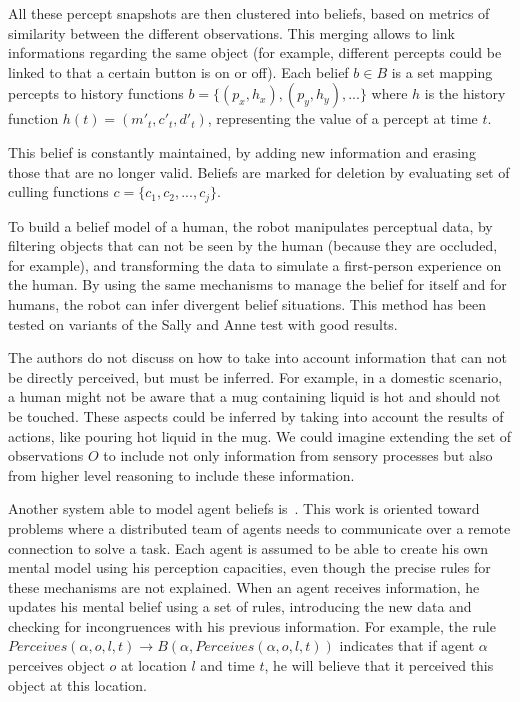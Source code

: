 All these percept snapshots are then clustered into beliefs, based on metrics of similarity between the different observations. This merging allows to link informations regarding the same object (for example, different percepts could be linked to that a certain button is on or off). Each belief $b \in B$ is a set mapping percepts to history functions $b = \{(p_x,h_x),(p_y,h_y),...\}$ where $h$ is the history function $h(t) = (m'_t, c'_t, d'_t)$, representing the value of a percept at time $t$.

This belief is constantly maintained, by adding new information and erasing those that are no longer valid. Beliefs are marked for deletion by evaluating set of culling functions $c = \{c_1,c_2,...,c_j\}$.

To build a belief model of a human, the robot manipulates perceptual data, by filtering objects that can not be seen by the human (because they are occluded, for example), and transforming the data to simulate a first-person experience on the human. By using the same mechanisms to manage the belief for itself and for humans, the robot can infer divergent belief situations. This method has been tested on variants of the Sally and Anne test with good results.

The authors do not discuss on how to take into account information that can not be directly perceived, but must be inferred. For example, in a domestic scenario, a human might not be aware that a mug containing liquid is hot and should not be touched. These aspects could be inferred by taking into account the results of actions, like pouring hot liquid in the mug. We could imagine extending the set of observations $O$ to include not only information from sensory processes but also from higher level reasoning to include these information.


Another system able to model agent beliefs is~\cite{scheutz2013computational}. This work is oriented toward problems where a distributed team of agents needs to communicate over a remote connection to solve a task. Each agent is assumed to be able to create his own mental model using his perception capacities, even though the precise rules for these mechanisms are not explained. When an agent receives information, he updates his mental belief using a set of rules, introducing the new data and checking for incongruences with his previous information. For example, the rule $Perceives(\alpha,o,l,t) \rightarrow  B(\alpha,Perceives(\alpha,o,l,t))$ indicates that if agent $\alpha$ perceives object $o$ at location $l$ and time $t$, he will believe that it perceived this object at this location.

